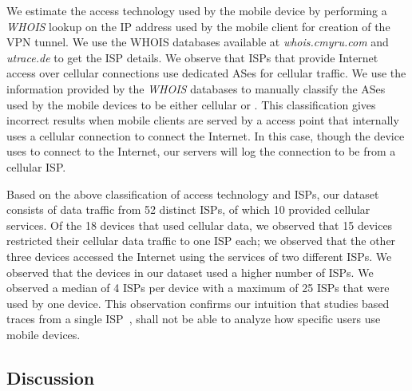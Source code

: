 We estimate the access technology used by the mobile device by performing a \emph{WHOIS} lookup on the IP address used by the mobile client for creation of the VPN tunnel. 
We use the WHOIS databases available at \emph{whois.cmyru.com} and \emph{utrace.de} to get the ISP details.
We observe that ISPs that provide Internet access over cellular connections use dedicated ASes for cellular traffic. 
We use the information provided by the \emph{WHOIS} databases to manually classify the ASes used by the mobile devices to be either cellular or \wifi.
This classification gives incorrect results when mobile clients are served by a \wifi access point that internally uses a cellular connection to connect the Internet.
In this case, though the device uses \wifi to connect to the Internet, our servers will log the connection to be from a cellular ISP. 


Based on the above classification of access technology and ISPs, our dataset consists of data traffic from 52 distinct ISPs, of which 10 provided cellular services.
Of the 18 devices that used cellular data, we observed that 15 devices restricted their cellular data traffic to one ISP each; we observed that the other three devices accessed the Internet using the services of two different ISPs.
We observed that the devices in our dataset used a higher number of \wifi ISPs.
We observed a median of 4 \wifi ISPs per device with a maximum of 25 \wifi ISPs that were used by one device.
This observation confirms our intuition that studies based traces from a single ISP~\cite{maier:mobtraffic, vallina-rod:ads}, shall not be able to analyze how specific users use mobile devices. 

\subsection{Discussion}

